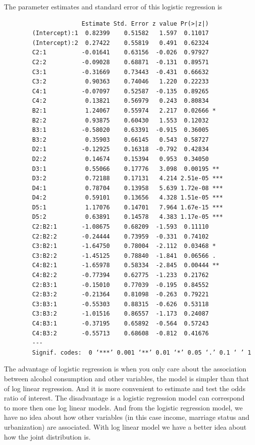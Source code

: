 \documentclass{article}
\begin{document}
	The parameter estimates and standard error of this logistic regression is
	\begin{verbatim}
                      Estimate Std. Error z value Pr(>|z|)    
        (Intercept):1  0.82399    0.51582   1.597  0.11017    
        (Intercept):2  0.27422    0.55819   0.491  0.62324    
        C2:1          -0.01641    0.63156  -0.026  0.97927    
        C2:2          -0.09028    0.68871  -0.131  0.89571    
        C3:1          -0.31669    0.73443  -0.431  0.66632    
        C3:2           0.90363    0.74046   1.220  0.22233    
        C4:1          -0.07097    0.52587  -0.135  0.89265    
        C4:2           0.13821    0.56979   0.243  0.80834    
        B2:1           1.24067    0.55974   2.217  0.02666 *  
        B2:2           0.93875    0.60430   1.553  0.12032    
        B3:1          -0.58020    0.63391  -0.915  0.36005    
        B3:2           0.35903    0.66145   0.543  0.58727    
        D2:1          -0.12925    0.16318  -0.792  0.42834    
        D2:2           0.14674    0.15394   0.953  0.34050    
        D3:1           0.55066    0.17776   3.098  0.00195 ** 
        D3:2           0.72188    0.17131   4.214 2.51e-05 ***
        D4:1           0.78704    0.13958   5.639 1.72e-08 ***
        D4:2           0.59101    0.13656   4.328 1.51e-05 ***
        D5:1           1.17076    0.14701   7.964 1.67e-15 ***
        D5:2           0.63891    0.14578   4.383 1.17e-05 ***
        C2:B2:1       -1.08675    0.68209  -1.593  0.11110    
        C2:B2:2       -0.24444    0.73959  -0.331  0.74102    
        C3:B2:1       -1.64750    0.78004  -2.112  0.03468 *  
        C3:B2:2       -1.45125    0.78840  -1.841  0.06566 .  
        C4:B2:1       -1.65978    0.58334  -2.845  0.00444 ** 
        C4:B2:2       -0.77394    0.62775  -1.233  0.21762    
        C2:B3:1       -0.15010    0.77039  -0.195  0.84552    
        C2:B3:2       -0.21364    0.81098  -0.263  0.79221    
        C3:B3:1       -0.55303    0.88315  -0.626  0.53118    
        C3:B3:2       -1.01516    0.86557  -1.173  0.24087    
        C4:B3:1       -0.37195    0.65892  -0.564  0.57243    
        C4:B3:2       -0.55713    0.68608  -0.812  0.41676    
        ---
        Signif. codes:  0 ‘***’ 0.001 ‘**’ 0.01 ‘*’ 0.05 ‘.’ 0.1 ‘ ’ 1
	\end{verbatim}

	The advantage of logistic regression is when you only care about the association between alcohol consumption and other variables, the model is simpler than that of log linear regression. And it is more convenient to estimate and test the odds ratio of interest. The disadvantage is a logistic regression model can correspond to more then one log linear models. And from the logistic regression model, we have no idea about how other variables (in this case income, marriage status and urbanization) are associated. With log linear model we have a better idea about how the joint distribution is.
\end{document}
